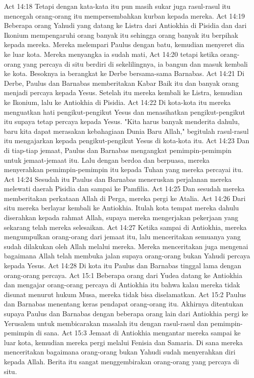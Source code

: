 Act 14:18  Tetapi dengan kata-kata itu pun masih sukar juga rasul-rasul itu mencegah orang-orang itu mempersembahkan kurban kepada mereka.
Act 14:19  Beberapa orang Yahudi yang datang ke Listra dari Antiokhia di Pisidia dan dari Ikonium mempengaruhi orang banyak itu sehingga orang banyak itu berpihak kepada mereka. Mereka melempari Paulus dengan batu, kemudian menyeret dia ke luar kota. Mereka menyangka ia sudah mati,
Act 14:20  tetapi ketika orang-orang yang percaya di situ berdiri di sekelilingnya, ia bangun dan masuk kembali ke kota. Besoknya ia berangkat ke Derbe bersama-sama Barnabas.
Act 14:21  Di Derbe, Paulus dan Barnabas memberitakan Kabar Baik itu dan banyak orang menjadi percaya kepada Yesus. Setelah itu mereka kembali ke Listra, kemudian ke Ikonium, lalu ke Antiokhia di Pisidia.
Act 14:22  Di kota-kota itu mereka menguatkan hati pengikut-pengikut Yesus dan menasihatkan pengikut-pengikut itu supaya tetap percaya kepada Yesus. "Kita harus banyak menderita dahulu, baru kita dapat merasakan kebahagiaan Dunia Baru Allah," begitulah rasul-rasul itu mengajarkan kepada pengikut-pengikut Yesus di kota-kota itu.
Act 14:23  Dan di tiap-tiap jemaat, Paulus dan Barnabas mengangkat pemimpin-pemimpin untuk jemaat-jemaat itu. Lalu dengan berdoa dan berpuasa, mereka menyerahkan pemimpin-pemimpin itu kepada Tuhan yang mereka percayai itu.
Act 14:24  Sesudah itu Paulus dan Barnabas meneruskan perjalanan mereka melewati daerah Pisidia dan sampai ke Pamfilia.
Act 14:25  Dan sesudah mereka memberitakan perkataan Allah di Perga, mereka pergi ke Atalia.
Act 14:26  Dari situ mereka berlayar kembali ke Antiokhia. Itulah kota tempat mereka dahulu diserahkan kepada rahmat Allah, supaya mereka mengerjakan pekerjaan yang sekarang telah mereka selesaikan.
Act 14:27  Ketika sampai di Antiokhia, mereka mengumpulkan orang-orang dari jemaat itu, lalu menceritakan semuanya yang sudah dilakukan oleh Allah melalui mereka. Mereka menceritakan juga mengenai bagaimana Allah telah membuka jalan supaya orang-orang bukan Yahudi percaya kepada Yesus.
Act 14:28  Di kota itu Paulus dan Barnabas tinggal lama dengan orang-orang percaya.
Act 15:1  Beberapa orang dari Yudea datang ke Antiokhia dan mengajar orang-orang percaya di Antiokhia itu bahwa kalau mereka tidak disunat menurut hukum Musa, mereka tidak bisa diselamatkan.
Act 15:2  Paulus dan Barnabas menentang keras pendapat orang-orang itu. Akhirnya ditentukan supaya Paulus dan Barnabas dengan beberapa orang lain dari Antiokhia pergi ke Yerusalem untuk membicarakan masalah itu dengan rasul-rasul dan pemimpin-pemimpin di sana.
Act 15:3  Jemaat di Antiokhia mengantar mereka sampai ke luar kota, kemudian mereka pergi melalui Fenisia dan Samaria. Di sana mereka menceritakan bagaimana orang-orang bukan Yahudi sudah menyerahkan diri kepada Allah. Berita itu sangat menggembirakan orang-orang yang percaya di situ.
